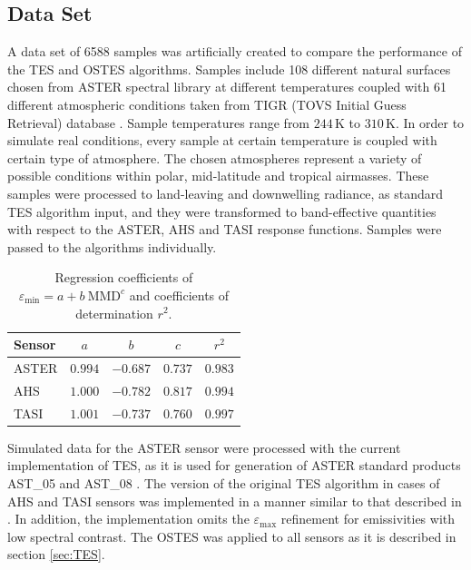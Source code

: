 \subsection*{Data Set}

A data set of 6588 samples was artificially created to compare the performance of the TES and OSTES algorithms. Samples include 108 different natural surfaces chosen from ASTER spectral library \cite{BH09} at different temperatures coupled with 61 different atmospheric conditions taken from TIGR (TOVS Initial Guess Retrieval) database \cite{CS85, CC98}. Sample temperatures range from $244\,\mathrm{K}$ to $310\,\mathrm{K}$. In order to simulate real conditions, every sample at certain temperature is coupled with certain type of atmosphere. The chosen atmospheres represent a variety of possible conditions within polar, mid-latitude and tropical airmasses. These samples were processed to land-leaving and downwelling radiance, as standard TES algorithm input, and they were transformed to band-effective quantities with respect to the ASTER, AHS and TASI response functions. Samples were passed to the algorithms individually.

\begin{table}[!t]
\vspace{0.5em}
\footnotesize
\centering
\begin{tabular}{lcccc}
\toprule
Sensor & $a$ & $b$ & $c$ & $r^2$\\ \hline
ASTER & $0.994$ & $-0.687$ & $0.737$ & $0.983$ \\
AHS & $1.000$ & $-0.782$ & $0.817$ & $0.994$ \\
TASI & $1.001$ & $-0.737$ & $0.760$ & $0.997$ \\
\bottomrule
\end{tabular}
\vspace{1.5 em}
\caption{Regression coefficients of $\varepsilon_\mathrm{min} = a + b\:\mathrm{MMD}^c$ and coefficients of determination $r^2$.}
\label{table:MMDcoef}
\normalsize
\end{table}

Simulated data for the ASTER sensor were processed with the current implementation of TES, as it is used for generation of ASTER standard products AST\_05 and AST\_08 \cite{B15}. The version of the original TES algorithm in cases of AHS and TASI sensors was implemented in a manner similar to that described in \cite{JS12}. In addition, the implementation omits the $\varepsilon_\mathrm{max}$ refinement for emissivities with low spectral contrast. The OSTES was applied to all sensors as it is described in section \ref{sec:TES}.

